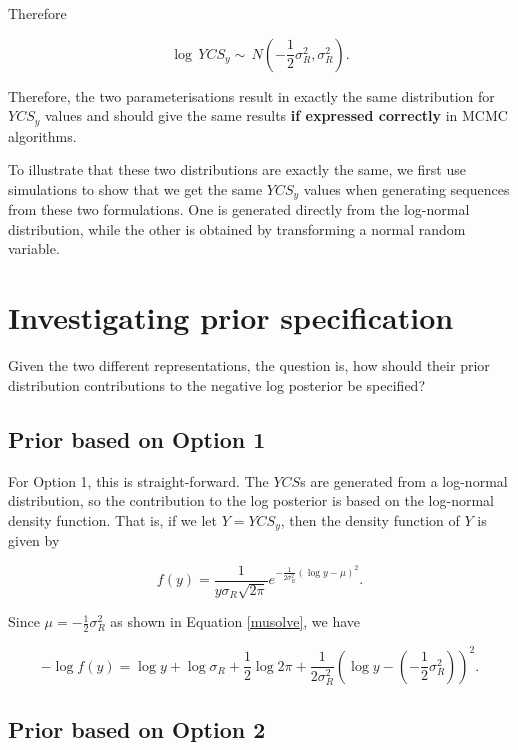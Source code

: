 \begin{appendices}
Therefore

\[\log\, YCS_y \sim \,N\left(-\frac{1}{2}\sigma^2_R, \sigma^2_R\right).\]

Therefore, the two parameterisations result in exactly the same distribution for \(YCS_y\) values and should give the same results \textbf{if expressed correctly} in MCMC algorithms.

To illustrate that these two distributions are exactly the same, we first use simulations to show that we get the same \(YCS_y\) values when generating sequences from these two formulations. One is generated directly from the log-normal distribution, while the other is obtained by transforming a normal random variable.

\section*{Investigating prior
	specification}\label{investigating-prior-specification}

Given the two different representations, the question is, how should their prior distribution contributions to the negative log posterior be specified?

\subsection*{Prior based on Option 1}\label{prior-based-on-option-1}

For Option 1, this is straight-forward. The \(YCS\)s are generated from a log-normal distribution, so the contribution to the log posterior is based on the log-normal density function. That is, if we let \(Y=YCS_y\), then the density function of \(Y\) is given by

\[f(y)= \frac{1}{y\sigma_R\sqrt{2\pi}}e^{-\frac{1}{2\sigma_R^2}(\log y -\mu)^2}.\]

Since \(\mu = -\frac{1}{2}\sigma^2_R\) as shown in Equation \ref{musolve}, we have

\begin{equation}
-\log f(y)= \log y + \log \sigma_R + \frac{1}{2}\log 2\pi + \frac{1}{2\sigma_R^2}\left(\log y - (-\frac{1}{2}\sigma^2_R)\right)^2.
\label{logfy}
\end{equation}

\subsection*{Prior based on Option 2}\label{prior-based-on-option-2}


\end{appendices}
